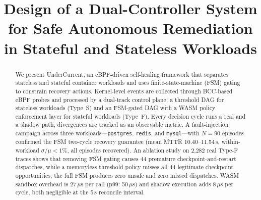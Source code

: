 \documentclass[conference]{IEEEtran}
\begin{document}
\title{Design of a Dual-Controller System for Safe Autonomous Remediation in Stateful and Stateless Workloads}

\author{%
\and
{}
\and
{}
}

\maketitle

\begin{abstract}
We present UnderCurrent, an eBPF-driven self-healing framework that separates stateless and stateful container workloads and uses finite-state-machine (FSM) gating to constrain recovery actions. Kernel-level events are collected through BCC-based eBPF probes and processed by a dual-track control plane: a threshold DAG for stateless workloads (Type~S) and an FSM-gated DAG with a WASM policy enforcement layer for stateful workloads (Type~F). Every decision cycle runs a real and a shadow path; divergences are tracked as an observable metric. A fault-injection campaign across three workloads---\texttt{postgres}, \texttt{redis}, and \texttt{mysql}---with $N = 90$ episodes confirmed the FSM two-cycle recovery guarantee (mean MTTR 10.40--11.54\,s, within-workload $\sigma/\mu < 1\%$, all episodes recovered). An ablation study on 2,282 real Type-F traces shows that removing FSM gating causes 44 premature checkpoint-and-restart dispatches, while a memoryless threshold policy misses all 44 legitimate checkpoint opportunities; the full FSM produces zero unsafe and zero missed dispatches. WASM sandbox overhead is 27\,$\mu$s per call (p99: 50\,$\mu$s) and shadow execution adds 8\,$\mu$s per cycle, both negligible at the 5\,s reconcile interval.
\end{abstract}
\end{document}
